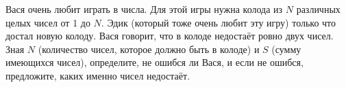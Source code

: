 Вася очень любит играть в числа. Для этой игры нужна колода из $N$ различных целых чисел от 1 до $N$.
Эдик (который тоже очень любит эту игру) только что достал новую колоду.
Вася говорит, что в колоде недостаёт ровно двух чисел.
Зная $N$ (количество чисел, которое должно быть в колоде) и $S$ (сумму имеющихся чисел),
определите, не ошибся ли Вася, и если не ошибся, предложите, каких именно чисел недостаёт.